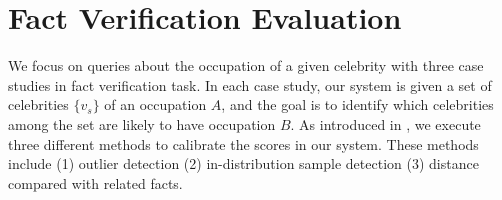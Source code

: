 \section{Fact Verification Evaluation}\label{sec:fact_ver_eval}
We focus on queries about the occupation of a given celebrity with three case studies in fact verification task. In each case study, our system is given a set of celebrities $\{v_s\}$ of an occupation $A$, and the goal is to identify which celebrities among the set are likely to have occupation $B$. 
As introduced in , we execute three different methods to calibrate the scores in our system. These methods include (1) outlier detection 
(2) in-distribution sample detection 
(3) distance compared with related facts.


